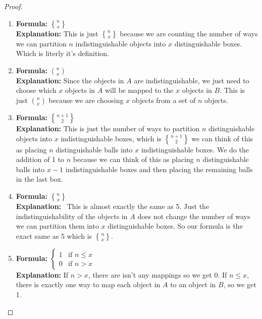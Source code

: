 \documentclass[answers]{exam}
\newcommand{\stirling}[2]{\genfrac{\{}{\}}{0pt}{}{#1}{#2}}
\begin{document}
\begin{solution}
\begin{proof}
\begin{enumerate}
                \item 
                    \textbf{Formula:} $\stirling{n}{x}$ \\
                    \textbf{Explanation:}
					This is just $\stirling{n}{x}$ because we are counting the number of ways we can partition $n$ indistinguishable objects into $x$ distinguishable boxes. Which is literly it's definition.
                
                \item 
                    \textbf{Formula:} $\binom{n}{x}$ \\
                    \textbf{Explanation:} 
					Since the objects in $A$ are indistinguishable, we just need to choose which $x$ objects in $A$ will be mapped to the $x$ objects in $B$. This is just $\binom{n}{x}$ because we are choosing $x$ objects from a set of $n$ objects.
                
                \item 
                    \textbf{Formula:} $\stirling{n+1}{2}$ \\
                    \textbf{Explanation:} 
					This is just the number of ways to partition $n$ distinguishable objects into $x$ indistinguishable boxes, which is $\stirling{n+1}{2}$ we can think of this as placing $n$ distinguishable balls into $x$ indistinguishable boxes. We do the addition of 1 to $n$ because we can think of this as placing $n$ distinguishable balls into $x-1$ indistinguishable boxes and then placing the remaining balls in the last box.
                
                \item 
                    \textbf{Formula:} $\stirling{n}{x}$ \\
                    \textbf{Explanation:} \
					This is almost exactly the same as 5. Just the indistinguishability of the objects in $A$ does not change the number of ways we can partition them into $x$ distinguishable boxes. So our formula is the exact same as 5 which is $\stirling{n}{x}$.
                
                \item 
                    \textbf{Formula:} $\begin{cases} 1 & \text{if } n \leq x \\ 0 & \text{if } n > x \end{cases}$ \\
                    \textbf{Explanation:} 
					If $n > x$, there are isn't any mappings so we get 0. If $n \leq x$, there is exactly one way to map each object in $A$ to an object in $B$, so we get 1.
                

\end{enumerate}
\end{proof}
\end{solution}
\end{document}
